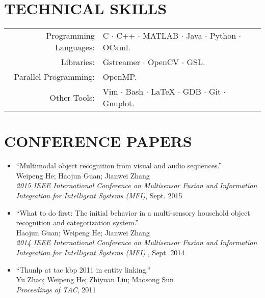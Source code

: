 \documentclass[a4paper,11pt]{article} %
\begin{document}

\section{TECHNICAL SKILLS}

\begin{tabular}{rl}
  Programming Languages: & C $\cdotp$ C++ $\cdotp$ MATLAB $\cdotp$ Java $\cdotp$ Python $\cdotp$ OCaml. \\
  Libraries: & Gstreamer $\cdotp$ OpenCV $\cdotp$ GSL\@. \\
  Parallel Programming: & OpenMP\@. \\
  Other Tools: & Vim $\cdotp$ Bash $\cdotp$ \LaTeX{} $\cdotp$ GDB $\cdotp$ Git $\cdotp$ Gnuplot. \\
\end{tabular}


\section{CONFERENCE PAPERS}
\begin{itemize}
  \item ``Multimodal object recognition from visual and audio sequences.'' \\
    Weipeng He; Haojun Guan; Jianwei Zhang \\
    \textit{2015 IEEE International Conference on Multisensor Fusion and Information Integration for Intelligent Systems (MFI)}, Sept. 2015 

  \item ``What to do first: The initial behavior in a multi-sensory household object recognition and categorization system.'' \\
    Haojun Guan; Weipeng He; Jianwei Zhang \\
    \textit{2014 IEEE International Conference on Multisensor Fusion and Information Integration for Intelligent Systems (MFI)} , Sept. 2014

  \item ``Thunlp at tac kbp 2011 in entity linking.'' \\
    Yu Zhao; Weipeng He; Zhiyuan Liu; Maosong Sun \\
    \textit{Proceedings of TAC}, 2011
\end{itemize}
\end{document}
